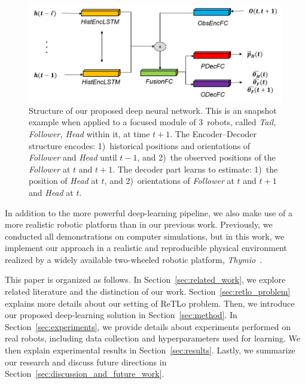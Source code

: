 \documentclass[letterpaper, 10 pt, conference]{ieeeconf}  %
\begin{document}
	\begin{figure}\centering
		\includegraphics[width=1.\columnwidth]{fig_DL_Pipeline}
		\caption{Structure of our proposed deep neural network.
			This is an snapshot example when applied to a focused module of
			$3$~robots, called \emph{Tail, Follower, Head} within it, at time $t+1$.
            The Encoder--Decoder structure encodes: 1)~historical
            positions and orientations of \emph{Follower} and \emph{Head}
            until $t-1$, and 2)~the observed positions of the \emph{Follower} at
            $t$ and $t+1$. The decoder part learns to estimate: 1)~the
            position of \emph{Head} at $t$, and 2)~orientations of
            \emph{Follower} at $t$ and $t+1$ and \emph{Head} at $t$.
		}
		\label{fig:DL_Pipeline}
	\end{figure}
    In addition to the more powerful deep-learning pipeline, we also
    make use of a more realistic robotic platform than in our previous
    work. Previously, we conducted all demonstrations on computer
    simulations, but in this work, we implement our approach in a
    realistic and reproducible physical environment realized by a widely
    available two-wheeled robotic platform, \emph{Thymio}~\cite{Shin14}.


    This paper is organized as follows. In
    Section~\ref{sec:related_work}, we explore related literature and
    the distinction of our work. Section~\ref{sec:retlo_problem} explains
    more details about our setting of ReTLo problem. Then, we introduce
    our proposed deep-learning solution in
    Section~\ref{sec:method}. In Section~\ref{sec:experiments}, we
    provide details about experiments performed on real robots,
    including data collection and hyperparameters used for learning. We
    then explain experimental results in Section~\ref{sec:results}.
    Lastly, we summarize our research and discuss future directions in
    Section~\ref{sec:discussion_and_future_work}.
\end{document}
